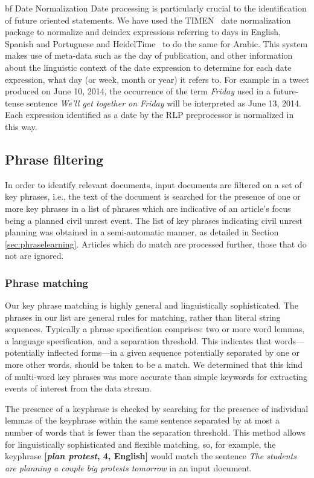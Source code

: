 {bf Date Normalization} Date processing is particularly crucial to the identification of
future oriented statements. We have used the TIMEN~\cite{LlorensDGS12} date
normalization package to normalize and deindex expressions referring
to days in English, Spanish and Portuguese and HeidelTime~\cite{strotgen2014time} to do the same for Arabic. This system makes use of
meta-data such as the day of publication, and other information about
the linguistic context of the date expression to determine for each
date expression, what day (or week, month or year) it refers to.  For
example in a tweet produced on June 10, 2014, the occurrence of the
term {\em Friday} used in a future-tense sentence {\em We'll get
  together on Friday} will be interpreted as June 13, 2014.  Each
expression identified as a date by the RLP preprocessor is normalized
in this way.

\vspace{-0.5em}
\subsection{Phrase filtering}
In order to identify relevant documents, input documents are filtered on a set of key phrases, i.e.,
the text of the document is searched for the presence of one or
more key phrases in a list of phrases which are indicative of an article's focus being
a planned civil unrest event.  
The list of key phrases indicating civil unrest planning was obtained
in a semi-automatic manner, as detailed in Section \ref{sec:phraselearning}.
Articles which do match are processed further, those that do not are ignored.

\subsubsection{Phrase matching}
Our key phrase matching is highly general and linguistically
sophisticated.  The phrases in our list are general rules for
matching, rather than literal string sequences. Typically a phrase
specification comprises: two or more word lemmas, a language
specification, and a separation threshold. This indicates that words---potentially inflected forms---in 
a given sequence potentially separated by one or more other words, should be taken to be a
match. We determined that this kind of
multi-word key phrases was more accurate than simple keywords for
extracting events of interest from the data stream.

The presence of a keyphrase is checked by searching for the presence of
individual lemmas of the keyphrase within the same sentence separated
by at most a number of words that is fewer than the separation threshold.  
This method allows for linguistically sophisticated and flexible matching, so, for example,
the keyphrase {\bf [{\em plan protest}, 4, English]} would match the sentence
{\em The students are planning a couple big protests tomorrow} in an input document.

